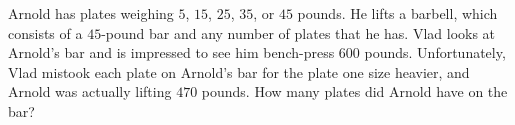 Arnold has plates weighing $5$, $15$, $25$, $35$, or $45$ pounds. He lifts a barbell, which consists of a $45$-pound bar and any number of plates that he has. Vlad looks at Arnold's bar and is impressed to see him bench-press $600$ pounds. Unfortunately, Vlad mistook each plate on Arnold's bar for the plate one size heavier, and Arnold was actually lifting $470$ pounds. How many plates did Arnold have on the bar?